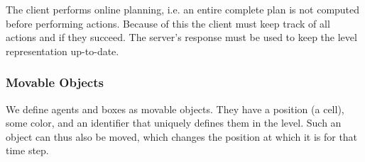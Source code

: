 The client performs online planning, i.e. an entire complete plan is not computed before performing actions.
Because of this the client must keep track of all actions and if they succeed.
The server's response must be used to keep the level representation up-to-date.

\subsubsection{Movable Objects}

We define agents and boxes as movable objects.
They have a position (a cell), some color, and an identifier that uniquely defines them in the level.
Such an object can thus also be moved, which changes the position at which it is for that time step.

